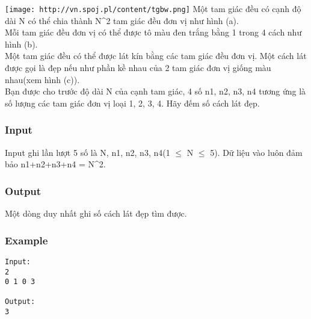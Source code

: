 




\texttt{[image: http://vn.spoj.pl/content/tgbw.png]}   Một tam giác đều có cạnh độ dài N có thể chia thành N^2 tam giác đều đơn vị như hình (a).   
\\   Mỗi tam giác đều đơn vị có thể được tô màu đen trắng bằng 1 trong 4 cách như hình (b).   
\\   Một tam giác đều có thể được lát kín bằng các tam giác đều đơn vị. Một cách lát được gọi là đẹp nếu như phần kề nhau của 2 tam giác đơn vị giống màu nhau(xem hình (c)).   
\\   Bạn được cho trước độ dài N của cạnh tam giác, 4 số n1, n2, n3, n4 tương ứng là số lượng các tam giác đơn vị loại 1, 2, 3, 4. Hãy đếm số cách lát đẹp.  

\subsubsection{   Input  }

   Input ghi lần lượt 5 số là N, n1, n2, n3, n4(1 $\le$ N $\le$ 5). Dữ liệu vào luôn đảm bảo n1+n2+n3+n4 = N^2.  

\subsubsection{   Output  }

   Một dòng duy nhất ghi số cách lát đẹp tìm được.  

\subsubsection{   Example  }
\begin{verbatim}
Input:
2
0 1 0 3

Output:
3
\end{verbatim}
